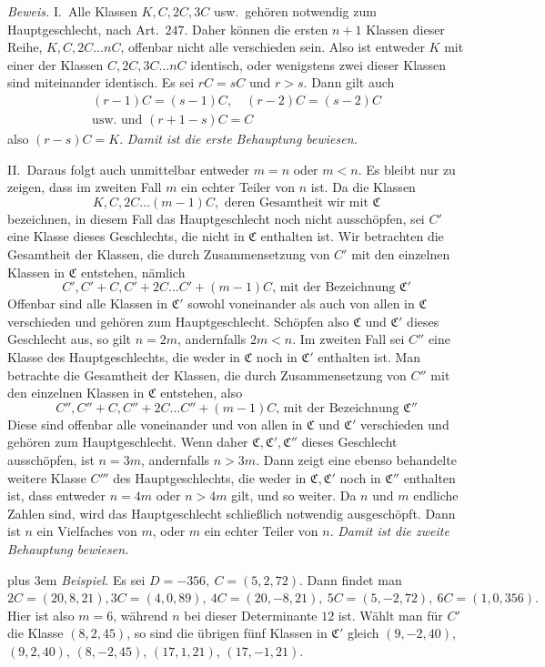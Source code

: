 \textit{Beweis.} I.\ Alle Klassen \(K,C,2C,3C\) usw.\ gehören notwendig zum Hauptgeschlecht, nach Art.\ \(247\). Daher können die ersten \(n+1\) Klassen dieser Reihe, \(K,C,2C\ldots nC\), offenbar nicht alle verschieden sein. Also ist entweder \(K\) mit einer der Klassen \(C,2C,3C\ldots nC\) identisch, oder wenigstens zwei dieser Klassen sind miteinander identisch.
Es sei \(rC=sC\) und \(r>s\). Dann gilt auch
\[\begin{gathered}(r-1)C=(s-1)C,\quad(r-2)C=(s-2)C\\\text{usw. und }(r+1-s)C=C\end{gathered}\]
also \((r-s)C=K\). \textit{Damit ist die erste Behauptung bewiesen.}

II.\ Daraus folgt auch unmittelbar entweder \(m=n\) oder \(m<n\). Es bleibt nur zu zeigen, dass im zweiten Fall \(m\) ein echter Teiler von \(n\) ist. Da die Klassen
\[K,C,2C\ldots(m-1)C,\text{ deren Gesamtheit wir mit }\mathfrak C\]
bezeichnen, in diesem Fall das Hauptgeschlecht noch nicht ausschöpfen, sei \(C'\) eine Klasse dieses Geschlechts, die nicht in \(\mathfrak C\) enthalten ist. Wir betrachten die Gesamtheit der Klassen, die durch Zusammensetzung von \(C'\) mit den einzelnen Klassen in \(\mathfrak C\) entstehen, nämlich
\[C',C'+C,C'+2C\ldots C'+(m-1)C\text{, mit der Bezeichnung }\mathfrak C'\]
Offenbar sind alle Klassen in \(\mathfrak C'\) sowohl voneinander als auch von allen in \(\mathfrak C\) verschieden und gehören zum Hauptgeschlecht. Schöpfen also \(\mathfrak C\) und \(\mathfrak C'\) dieses Geschlecht aus, so gilt \(n=2m\), andernfalls \(2m<n\). Im zweiten Fall sei \(C''\) eine Klasse des Hauptgeschlechts, die weder in \(\mathfrak C\) noch in \(\mathfrak C'\) enthalten ist. Man betrachte die Gesamtheit der Klassen, die durch Zusammensetzung von \(C''\) mit den einzelnen Klassen in \(\mathfrak C\) entstehen, also
\[C'',C''+C,C''+2C\ldots C''+(m-1)C\text{, mit der Bezeichnung }\mathfrak C''\]
Diese sind offenbar alle voneinander und von allen in \(\mathfrak C\) und \(\mathfrak C'\) verschieden und gehören zum Hauptgeschlecht. Wenn daher \(\mathfrak C,\mathfrak C',\mathfrak C''\) dieses Geschlecht ausschöpfen, ist \(n=3m\), andernfalls \(n>3m\). Dann zeigt eine ebenso behandelte weitere Klasse \(C'''\) des Hauptgeschlechts, die weder in \(\mathfrak C,\mathfrak C'\) noch in \(\mathfrak C''\) enthalten ist, dass entweder \(n=4m\) oder \(n>4m\) gilt, und so weiter. Da \(n\) und \(m\) endliche Zahlen sind, wird das Hauptgeschlecht schließlich notwendig ausgeschöpft. Dann ist \(n\) ein Vielfaches von \(m\), oder \(m\) ein echter Teiler von \(n\). \textit{Damit ist die zweite Behauptung bewiesen.}

\begingroup\rightskip=0pt plus 3em\relax
\textit{Beispiel.} Es sei \(D=-356,\ C=(5,2,72)\). Dann findet man \(2C=(20,8,21), 3C=(4,0,89),\ 4C=(20,-8,21),\ 5C=(5,-2,72),\ 6C=(1,0,356).\) Hier
ist also \(m=6\), während \(n\) bei dieser Determinante \(12\) ist. Wählt man für \(C'\) die Klasse \((8,2,45)\), so sind die übrigen fünf Klassen in \(\mathfrak C'\) gleich \((9,-2,40)\), \((9,2,40)\), \((8,-2,45)\), \((17,1,21)\), \((17,-1,21)\).
\par\endgroup

